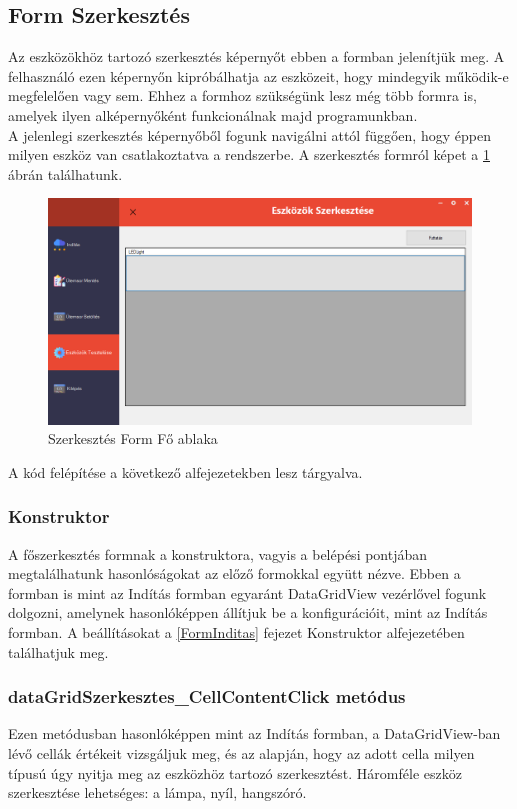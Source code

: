 \documentclass[tocnopagenum]{thesis-ekf}
\theoremstyle{definition}
\theoremstyle{remark}
\begin{document}
	
	\subsection{Form Szerkesztés}
	\label{Form Szerkesztes}
	Az eszközökhöz tartozó szerkesztés képernyőt ebben a formban jelenítjük meg. A felhasználó ezen képernyőn kipróbálhatja az eszközeit, hogy mindegyik működik-e megfelelően vagy sem. Ehhez a formhoz szükségünk lesz még több formra is, amelyek ilyen alképernyőként funkcionálnak majd programunkban.
	\\
	A jelenlegi szerkesztés képernyőből fogunk navigálni attól függően, hogy éppen milyen eszköz van csatlakoztatva a rendszerbe. A szerkesztés formról képet a \ref{fig:SzerkformFo} ábrán találhatunk.
	\begin{figure}[H]	
		\centering
		\includegraphics[scale=0.5]{FormSzerk_page}
		\caption[Szerkesztés Form Fő ablaka]{Szerkesztés Form Fő ablaka}
		\label{fig:SzerkformFo}
	\end{figure}
	A kód felépítése a következő alfejezetekben lesz tárgyalva.
	\subsubsection{Konstruktor}
	A főszerkesztés formnak a konstruktora, vagyis a belépési pontjában megtalálhatunk hasonlóságokat az előző formokkal együtt nézve.
	Ebben a formban is mint az Indítás formban egyaránt DataGridView vezérlővel fogunk dolgozni, amelynek hasonlóképpen állítjuk be a konfigurációit, mint az Indítás formban. A beállításokat a \ref{FormInditas} fejezet Konstruktor alfejezetében találhatjuk meg.
	\subsubsection{dataGridSzerkesztes\_CellContentClick metódus}
	Ezen metódusban hasonlóképpen mint az Indítás formban, a DataGridView-ban lévő cellák értékeit vizsgáljuk meg, és az alapján, hogy az adott cella milyen típusú úgy nyitja meg az eszközhöz tartozó  szerkesztést. Háromféle eszköz szerkesztése lehetséges: a lámpa, nyíl, hangszóró.
\end{document}

